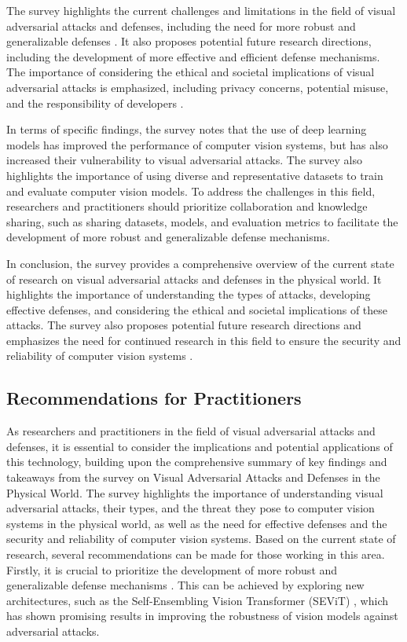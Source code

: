 \documentclass[11pt]{article}
\begin{document}
The survey highlights the current challenges and limitations in the field of visual adversarial attacks and defenses, including the need for more robust and generalizable defenses \cite{ref8}. It also proposes potential future research directions, including the development of more effective and efficient defense mechanisms. The importance of considering the ethical and societal implications of visual adversarial attacks is emphasized, including privacy concerns, potential misuse, and the responsibility of developers \cite{ref113}.

In terms of specific findings, the survey notes that the use of deep learning models has improved the performance of computer vision systems, but has also increased their vulnerability to visual adversarial attacks. The survey also highlights the importance of using diverse and representative datasets to train and evaluate computer vision models. To address the challenges in this field, researchers and practitioners should prioritize collaboration and knowledge sharing, such as sharing datasets, models, and evaluation metrics to facilitate the development of more robust and generalizable defense mechanisms.

In conclusion, the survey provides a comprehensive overview of the current state of research on visual adversarial attacks and defenses in the physical world. It highlights the importance of understanding the types of attacks, developing effective defenses, and considering the ethical and societal implications of these attacks. The survey also proposes potential future research directions and emphasizes the need for continued research in this field to ensure the security and reliability of computer vision systems \cite{ref90}.

\subsection{Recommendations for Practitioners}

As researchers and practitioners in the field of visual adversarial attacks and defenses, it is essential to consider the implications and potential applications of this technology, building upon the comprehensive summary of key findings and takeaways from the survey on Visual Adversarial Attacks and Defenses in the Physical World. The survey highlights the importance of understanding visual adversarial attacks, their types, and the threat they pose to computer vision systems in the physical world, as well as the need for effective defenses and the security and reliability of computer vision systems. Based on the current state of research, several recommendations can be made for those working in this area. Firstly, it is crucial to prioritize the development of more robust and generalizable defense mechanisms \cite{ref8}. This can be achieved by exploring new architectures, such as the Self-Ensembling Vision Transformer (SEViT) \cite{ref174}, which has shown promising results in improving the robustness of vision models against adversarial attacks.
\end{document}

